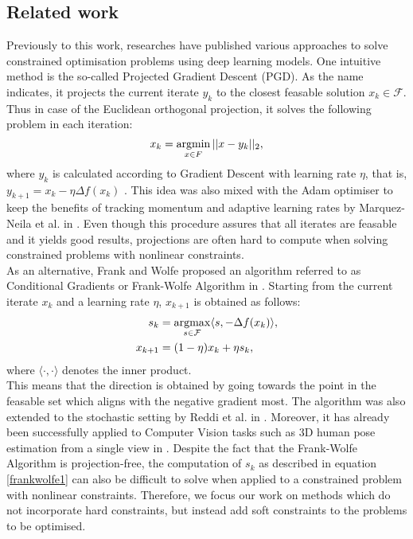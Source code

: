 \subsection{Related work}
Previously to this work, researches have published various approaches to solve constrained optimisation problems using deep learning models. One intuitive method is the so-called Projected Gradient Descent (PGD). As the name indicates, it projects the current iterate $y_k$ to the closest feasable solution $x_k \in \mathcal{F}$. Thus in case of the Euclidean orthogonal projection, it solves the following problem in each iteration:
\[ x_k = \operatorname*{argmin}_{x \in F} ||x - y_k||_2, \]
where $y_k$ is calculated according to Gradient Descent with learning rate $\eta$, that is, $y_{k+1} = x_k - \eta \Delta f(x_{k})$ \cite{Chen}. This idea was also mixed with the Adam optimiser to keep the benefits of tracking momentum and adaptive learning rates by Marquez-Neila et al. in \cite{DBLP:journals/corr/Marquez-NeilaSF17}. Even though this procedure assures that all iterates are feasable and it yields good results, projections are often hard to compute when solving constrained problems with nonlinear constraints. \\
\indent As an alternative, Frank and Wolfe proposed an algorithm referred to as Conditional Gradients or Frank-Wolfe Algorithm in \cite{doi:10.1002/nav.3800030109}. Starting from the current iterate $x_k$ and a learning rate $\eta$, $x_{k+1}$ is obtained as follows:
\begin{subequations}
	\label{eq:frankwolfe}
	\begin{align}
		s_k &= \operatorname*{argmax}_{s \in \mathcal{F}} \langle s, -\Delta f(x_k) \rangle \label{frankwolfe1},\\
		x_{k+1} &= (1-\eta) x_k + \eta s_k,
	\end{align}
\end{subequations}
where $\langle \cdot, \cdot \rangle$ denotes the inner product.\\
This means that the direction is obtained by going towards the point in the feasable set which aligns with the negative gradient most. The algorithm was also extended to the stochastic setting by Reddi et al. in \cite{Reddi2016StochasticFM}. Moreover, it has already been successfully applied to Computer Vision tasks such as 3D human pose estimation from a single view in \cite{DBLP:journals/corr/abs-1803-06453}. Despite the fact that the Frank-Wolfe Algorithm is projection-free, the computation of $s_k$ as described in equation \eqref{frankwolfe1} can also be difficult to solve when applied to a constrained problem with nonlinear constraints. Therefore, we focus our work on methods which do not incorporate hard constraints, but instead add soft constraints to the problems to be optimised.


\clearpage

